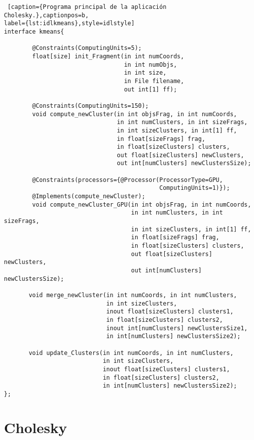 \begin{minipage}{\linewidth}
\begin{lstlisting} [caption={Programa principal de la aplicación Cholesky.},captionpos=b, 
label={lst:idlkmeans},style=idlstyle]
interface kmeans{

        @Constraints(ComputingUnits=5);
        float[size] init_Fragment(in int numCoords,
								  in int numObjs,
								  in int size,
								  in File filename,
								  out int[1] ff);

        @Constraints(ComputingUnits=150);
        void compute_newCluster(in int objsFrag, in int numCoords, 
								in int numClusters, in int sizeFrags, 
								in int sizeClusters, in int[1] ff, 
								in float[sizeFrags] frag, 
								in float[sizeClusters] clusters, 
								out float[sizeClusters] newClusters, 
								out int[numClusters] newClustersSize);

        @Constraints(processors={@Processor(ProcessorType=GPU, 
											ComputingUnits=1)});
        @Implements(compute_newCluster);
        void compute_newCluster_GPU(in int objsFrag, in int numCoords,
									in int numClusters, in int sizeFrags,
									in int sizeClusters, in int[1] ff,
									in float[sizeFrags] frag,
									in float[sizeClusters] clusters,
									out float[sizeClusters] newClusters, 
									out int[numClusters] newClustersSize);

       void merge_newCluster(in int numCoords, in int numClusters, 
							 in int sizeClusters, 
							 inout float[sizeClusters] clusters1, 
							 in float[sizeClusters] clusters2,
							 inout int[numClusters] newClustersSize1, 
							 in int[numClusters] newClustersSize2);

       void update_Clusters(in int numCoords, in int numClusters,
							in int sizeClusters, 
							inout float[sizeClusters] clusters1,
							in float[sizeClusters] clusters2,
							in int[numClusters] newClustersSize2);
};

\end{lstlisting}
\end{minipage}

\newpage

\section{Cholesky}
\label{sec:codigocholesky}

